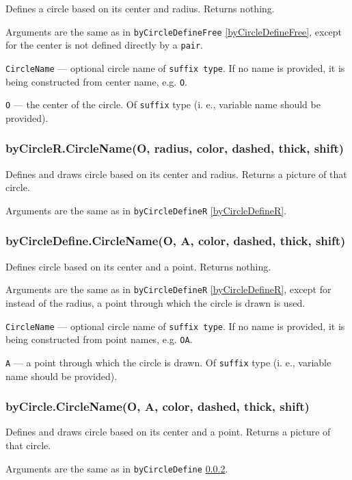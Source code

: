 \documentclass{ltxdoc}
\begin{document}
	Defines a circle based on its center and radius. Returns nothing.
	
	Arguments are the same as in \texttt{byCircleDefineFree} \ref{byCircleDefineFree}, except for the center is not defined directly by a \texttt{pair}.
	
	\texttt{CircleName} — optional circle name of \texttt{suffix type}. If no name is provided, it is being constructed from center name, e.g. \texttt{O}.
	
	\texttt{O} — the center of the circle. Of \texttt{suffix} type (i. e., variable name should be provided).

\subsubsection{byCircleR.CircleName(O, radius, color, dashed, thick, shift)}\label{byCircleR}
	
	Defines and draws circle based on its center and radius. Returns a picture of that circle.
	
	Arguments are the same as in \texttt{byCircleDefineR} \ref{byCircleDefineR}.

\subsubsection{byCircleDefine.CircleName(O, A, color, dashed, thick, shift)}\label{byCircleDefine}
	
	Defines circle based on its center and a point. Returns nothing.
	
	Arguments are the same as in \texttt{byCircleDefineR} \ref{byCircleDefineR}, except for instead of the radius, a point through which the circle is drawn is used.
	
	\texttt{CircleName} — optional circle name of \texttt{suffix type}. If no name is provided, it is being constructed from point names, e.g. \texttt{OA}.
	
	\texttt{A} — a point through which the circle is drawn. Of \texttt{suffix} type (i. e., variable name should be provided).

\subsubsection{byCircle.CircleName(O, A, color, dashed, thick, shift)}\label{byCircle}
	
	Defines and draws circle based on its center and a point. Returns a picture of that circle.
	
	Arguments are the same as in \texttt{byCircleDefine} \ref{byCircleDefine}.
\end{document}
